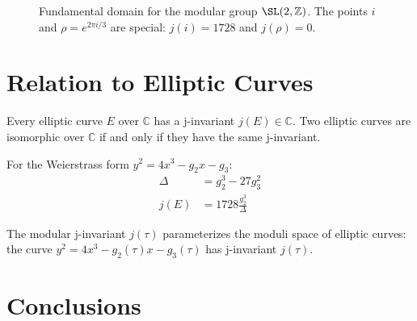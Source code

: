 \begin{figure}[h]
\centering
{}
\caption{Fundamental domain for the modular group $\SL(2,\mathbb{Z})$. The points $i$ and $\rho = e^{2\pi i/3}$ are special: $j(i) = 1728$ and $j(\rho) = 0$.}
\label{fig:fundamental_domain}
\end{figure}

\section{Relation to Elliptic Curves}

\begin{theorem}
Every elliptic curve $E$ over $\mathbb{C}$ has a j-invariant $j(E) \in \mathbb{C}$. Two elliptic curves are isomorphic over $\mathbb{C}$ if and only if they have the same j-invariant.
\end{theorem}

For the Weierstrass form $y^2 = 4x^3 - g_2 x - g_3$:
\begin{align}
    \Delta &= g_2^3 - 27g_3^2 \\
    j(E) &= 1728 \frac{g_2^3}{\Delta}
\end{align}

The modular j-invariant $j(\tau)$ parameterizes the moduli space of elliptic curves: the curve $y^2 = 4x^3 - g_2(\tau)x - g_3(\tau)$ has j-invariant $j(\tau)$.

\section{Conclusions}

